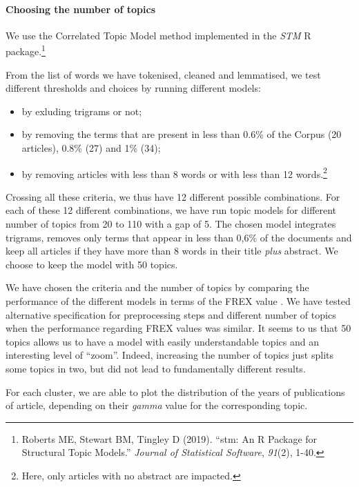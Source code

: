 \documentclass[]{elsarticle} %
\providecommand{\tightlist}{%
  \setlength{\itemsep}{0pt}\setlength{\parskip}{0pt}}
\begin{document}
\hypertarget{choosing-the-number-of-topics}{%
\paragraph*{Choosing the number of
topics}\label{choosing-the-number-of-topics}}

We use the Correlated Topic Model \citep{blei2007} method implemented in
the \emph{STM} R package.\footnote{Roberts ME, Stewart BM, Tingley D
  (2019). ``stm: An R Package for Structural Topic Models.''
  \emph{Journal of Statistical Software}, \emph{91}(2), 1-40.}

From the list of words we have tokenised, cleaned and lemmatised, we
test different thresholds and choices by running different models:

\begin{itemize}
\tightlist
\item
  by exluding trigrams or not;
\item
  by removing the terms that are present in less than 0.6\% of the
  Corpus (20 articles), 0.8\% (27) and 1\% (34);
\item
  by removing articles with less than 8 words or with less than 12
  words.\footnote{Here, only articles with no abstract are impacted.}
\end{itemize}

Crossing all these criteria, we thus have 12 different possible
combinations. For each of these 12 different combinations, we have run
topic models for different number of topics from 20 to 110 with a gap of
5. The chosen model integrates trigrams, removes only terms that appear
in less than 0,6\% of the documents and keep all articles if they have
more than 8 words in their title \emph{plus} abstract. We choose to keep
the model with 50 topics.

We have chosen the criteria and the number of topics by comparing the
performance of the different models in terms of the FREX value
\citep{bischof2012}. We have tested alternative specification for
preprocessing steps and different number of topics when the performance
regarding FREX values was similar. It seems to us that 50 topics allows
us to have a model with easily understandable topics and an interesting
level of ``zoom''. Indeed, increasing the number of topics just splits
some topics in two, but did not lead to fundamentally different results.

For each cluster, we are able to plot the distribution of the years of
publications of article, depending on their \emph{gamma} value for the
corresponding topic.
\end{document}
